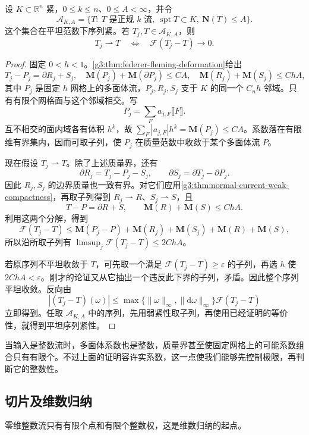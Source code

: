 \begin{proposition}\label{g3:prop:normal-bounded-flat-precompactness}
	设 \(K\subset\mathbb R^n\) 紧，\(0\le k\le n\)、\(0\le A<\infty\)，并令
	\[
		\mathcal A_{K,A}
		=\{T:\ T\text{ 是正规 }k\text{ 流},\
		\operatorname{spt}T\subset K,\ \mathbf N(T)\le A\}.
	\]
	这个集合在平坦范数下序列紧。若 \(T_j,T\in\mathcal A_{K,A}\)，则
	\[
		T_j\rightharpoonup T
		\quad\Longleftrightarrow\quad
		\mathcal F(T_j-T)\longrightarrow0.
	\]
\end{proposition}
\begin{proof}
	固定 \(0<h<1\)。\cref{g3:thm:federer-fleming-deformation}给出
	\[
		T_j-P_j=\partial R_j+S_j,
		\quad
		\mathbf M(P_j)+\mathbf M(\partial P_j)\le C A,
		\quad
		\mathbf M(R_j)+\mathbf M(S_j)\le ChA,
	\]
	其中 \(P_j\) 是固定 \(h\) 网格上的多面体流，\(P_j,R_j,S_j\) 支于 \(K\) 的同一个 \(C_nh\) 邻域。只有有限个网格面与这个邻域相交。写
	\[
		P_j=\sum_{F}a_{j,F}\lBrack F\rBrack.
	\]
	互不相交的面内域各有体积 \(h^k\)，故
	\(\sum_F|a_{j,F}|h^k=\mathbf M(P_j)\le CA\)。系数落在有限维有界集内，因而可取子列，使 \(P_j\) 在质量范数中收敛于某个多面体流 \(P\)。

	现在假设 \(T_j\rightharpoonup T\)。除了上述质量界，还有
	\[
		\partial R_j=T_j-P_j-S_j,\qquad
		\partial S_j=\partial T_j-\partial P_j.
	\]
	因此 \(R_j,S_j\) 的边界质量也一致有界。对它们应用\cref{g3:thm:normal-current-weak-compactness}，再取子列得到 \(R_j\rightharpoonup R\)、\(S_j\rightharpoonup S\)，且
	\[
		T-P=\partial R+S,\qquad
		\mathbf M(R)+\mathbf M(S)\le ChA.
	\]
	利用这两个分解，得到
	\[
		\mathcal F(T_j-T)
		\le\mathbf M(P_j-P)
		+\mathbf M(R_j)+\mathbf M(S_j)+\mathbf M(R)+\mathbf M(S),
	\]
	所以沿所取子列有 \(\limsup_j\mathcal F(T_j-T)\le2ChA\)。

	若原序列不平坦收敛于 \(T\)，可先取一个满足 \(\mathcal F(T_j-T)\ge\varepsilon\) 的子列，再选 \(h\) 使 \(2ChA<\varepsilon\)。刚才的论证又从它抽出一个违反此下界的子列，矛盾。因此整个序列平坦收敛。反向由
	\[
		|(T_j-T)(\omega)|
		\le\max\{\|\omega\|_\infty,\|\mathrm d\omega\|_\infty\}
		\mathcal F(T_j-T)
	\]
	立即得到。任取 \(\mathcal A_{K,A}\) 中的序列，先用弱紧性取子列，再使用已经证明的等价性，就得到平坦序列紧性。
\end{proof}

当输入是整数流时，多面体系数也是整数，质量界甚至使固定网格上的可能系数组合只有有限个。不过上面的证明容许实系数，这一点使我们能够先控制极限，再判断它的整数性。

\subsection{切片及维数归纳}
\label{g3:subsec:2205:03}
零维整数流只有有限个点和有限个整数权，这是维数归纳的起点。

